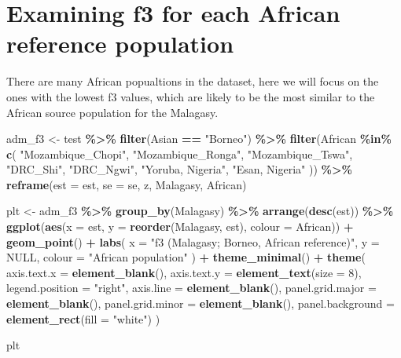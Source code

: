 \documentclass[
]{article}
\newenvironment{Shaded}{\begin{snugshade}}{\end{snugshade}}
\newcommand{\AttributeTok}[1]{\textcolor[rgb]{0.13,0.29,0.53}{#1}}
\newcommand{\ConstantTok}[1]{\textcolor[rgb]{0.56,0.35,0.01}{#1}}
\newcommand{\DecValTok}[1]{\textcolor[rgb]{0.00,0.00,0.81}{#1}}
\newcommand{\FunctionTok}[1]{\textcolor[rgb]{0.13,0.29,0.53}{\textbf{#1}}}
\newcommand{\NormalTok}[1]{#1}
\newcommand{\OtherTok}[1]{\textcolor[rgb]{0.56,0.35,0.01}{#1}}
\newcommand{\SpecialCharTok}[1]{\textcolor[rgb]{0.81,0.36,0.00}{\textbf{#1}}}
\newcommand{\StringTok}[1]{\textcolor[rgb]{0.31,0.60,0.02}{#1}}
\begin{document}
\section{Examining f3 for each African reference
population}\label{examining-f3-for-each-african-reference-population}

There are many African popualtions in the dataset, here we will focus on
the ones with the lowest f3 values, which are likely to be the most
similar to the African source population for the Malagasy.

\begin{Shaded}
\begin{Highlighting}[]
\NormalTok{adm\_f3 }\OtherTok{\textless{}{-}}\NormalTok{ test }\SpecialCharTok{\%\textgreater{}\%}
  \FunctionTok{filter}\NormalTok{(Asian }\SpecialCharTok{==} \StringTok{"Borneo"}\NormalTok{) }\SpecialCharTok{\%\textgreater{}\%}
  \FunctionTok{filter}\NormalTok{(African }\SpecialCharTok{\%in\%} \FunctionTok{c}\NormalTok{(}
    \StringTok{"Mozambique\_Chopi"}\NormalTok{, }\StringTok{"Mozambique\_Ronga"}\NormalTok{, }\StringTok{"Mozambique\_Tswa"}\NormalTok{,}
    \StringTok{"DRC\_Shi"}\NormalTok{, }\StringTok{"DRC\_Ngwi"}\NormalTok{, }\StringTok{"Yoruba, Nigeria"}\NormalTok{, }\StringTok{"Esan, Nigeria"}
\NormalTok{  )) }\SpecialCharTok{\%\textgreater{}\%}
  \FunctionTok{reframe}\NormalTok{(}\AttributeTok{est =}\NormalTok{ est, }\AttributeTok{se =}\NormalTok{ se, z, Malagasy, African)}

\NormalTok{plt }\OtherTok{\textless{}{-}}\NormalTok{ adm\_f3 }\SpecialCharTok{\%\textgreater{}\%}
  \FunctionTok{group\_by}\NormalTok{(Malagasy) }\SpecialCharTok{\%\textgreater{}\%}
  \FunctionTok{arrange}\NormalTok{(}\FunctionTok{desc}\NormalTok{(est)) }\SpecialCharTok{\%\textgreater{}\%}
  \FunctionTok{ggplot}\NormalTok{(}\FunctionTok{aes}\NormalTok{(}\AttributeTok{x =}\NormalTok{ est, }\AttributeTok{y =} \FunctionTok{reorder}\NormalTok{(Malagasy, est), }\AttributeTok{colour =}\NormalTok{ African)) }\SpecialCharTok{+}
  \FunctionTok{geom\_point}\NormalTok{() }\SpecialCharTok{+}
  \FunctionTok{labs}\NormalTok{(}
    \AttributeTok{x =} \StringTok{"f3 (Malagasy; Borneo, African reference)"}\NormalTok{, }\AttributeTok{y =} \ConstantTok{NULL}\NormalTok{,}
    \AttributeTok{colour =} \StringTok{"African population"}
\NormalTok{  ) }\SpecialCharTok{+}
  \FunctionTok{theme\_minimal}\NormalTok{() }\SpecialCharTok{+}
  \FunctionTok{theme}\NormalTok{(}
    \AttributeTok{axis.text.x =} \FunctionTok{element\_blank}\NormalTok{(),}
    \AttributeTok{axis.text.y =} \FunctionTok{element\_text}\NormalTok{(}\AttributeTok{size =} \DecValTok{8}\NormalTok{),}
    \AttributeTok{legend.position =} \StringTok{"right"}\NormalTok{,}
    \AttributeTok{axis.line =} \FunctionTok{element\_blank}\NormalTok{(),}
    \AttributeTok{panel.grid.major =} \FunctionTok{element\_blank}\NormalTok{(),}
    \AttributeTok{panel.grid.minor =} \FunctionTok{element\_blank}\NormalTok{(),}
    \AttributeTok{panel.background =} \FunctionTok{element\_rect}\NormalTok{(}\AttributeTok{fill =} \StringTok{"white"}\NormalTok{)}
\NormalTok{  )}

\NormalTok{plt}
\end{Highlighting}
\end{Shaded}
\end{document}
